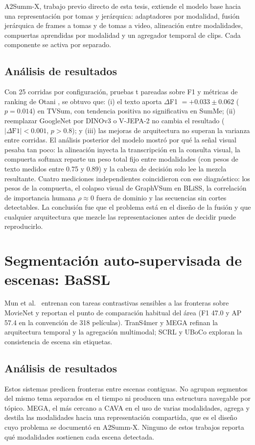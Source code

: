 A2Summ-X, trabajo previo directo de esta tesis, extiende el modelo base hacia una
representación por tomas y jerárquica: adaptadores por modalidad, fusión jerárquica de frames
a tomas y de tomas a video, alineación entre modalidades, compuertas aprendidas por modalidad
y un agregador temporal de clips. Cada componente se activa por separado.

\subsection{Análisis de resultados}
Con 25 corridas por configuración, pruebas t pareadas sobre F1 y métricas de ranking de
Otani \cite{otani2016deep}, se obtuvo que: (i) el texto aporta $\Delta$F1 $= +0.033 \pm
0.062$ ($p = 0.014$) en TVSum, con tendencia positiva no significativa en SumMe; (ii)
reemplazar GoogleNet por DINOv3 o V-JEPA-2 no cambia el resultado ($|\Delta \text{F1}| <
0.001$, $p > 0.8$); y (iii) las mejoras de arquitectura no superan la varianza entre
corridas. El análisis posterior del modelo mostró por qué la señal visual pesaba tan poco: la
alineación inyecta la transcripción en la consulta visual, la compuerta softmax reparte un
peso total fijo entre modalidades (con pesos de texto medidos entre 0.75 y 0.89) y la cabeza
de decisión solo lee la mezcla resultante. Cuatro mediciones independientes coincidieron con
ese diagnóstico: los pesos de la compuerta, el colapso visual de GraphVSum en BLiSS, la
correlación de importancia humana $\rho \approx 0$ fuera de dominio y las secuencias sin
cortes detectables. La conclusión fue que el problema está en el diseño de la fusión y que
cualquier arquitectura que mezcle las representaciones antes de decidir puede reproducirlo.

\section{Segmentación auto-supervisada de escenas: BaSSL}

Mun et al.\ \cite{mun2022bassl} entrenan con tareas contrastivas sensibles a las fronteras
sobre MovieNet \cite{huang2020movienet} y reportan el punto de comparación habitual del área
(F1 47.0 y AP 57.4 en la convención de 318 películas). TranS4mer \cite{islam2023trans4mer} y
MEGA \cite{sadoughi2023mega} refinan la arquitectura temporal y la agregación multimodal;
SCRL \cite{wu2022scrl} y UBoCo \cite{kang2022uboco} exploran la consistencia de escena sin
etiquetas.

\subsection{Análisis de resultados}
Estos sistemas predicen fronteras entre escenas contiguas. No agrupan segmentos del mismo
tema separados en el tiempo ni producen una estructura navegable por tópico. MEGA, el más
cercano a CAVA en el uso de varias modalidades, agrega y destila las modalidades hacia una
representación compartida, que es el diseño cuyo problema se documentó en A2Summ-X. Ninguno
de estos trabajos reporta qué modalidades sostienen cada escena detectada.

